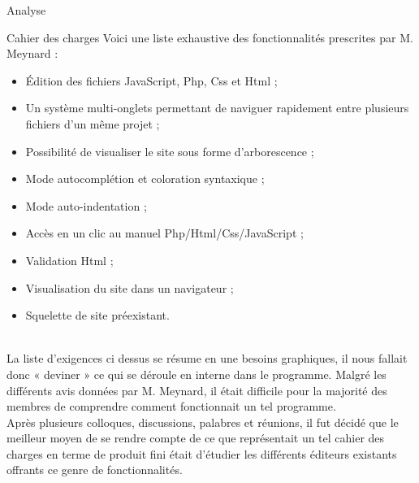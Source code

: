 \documentclass[a4paper, 12pt]{report}
\begin{document}
	\begin{part}{Analyse}
		\begin{chapter}{Cahier des charges}
			Voici une liste exhaustive des fonctionnalités prescrites par M. Meynard :
			\begin{itemize}
				\item Édition des fichiers \gls{JavaScript}, \gls{Php}, \gls{Css} et \gls{Html} ;
				\item Un système multi-onglets permettant de naviguer rapidement entre plusieurs fichiers d'un même projet ;
				\item Possibilité de visualiser le site sous forme d'arborescence ;
				\item Mode \gls{autocomplétion} et coloration syntaxique ;
				\item Mode auto-indentation ;
				\item Accès en un clic au manuel \gls{Php}/\gls{Html}/\gls{Css}/\gls{JavaScript} ;
				\item Validation \gls{Html} ;
				\item Visualisation du site dans un navigateur ;
				\item Squelette de site préexistant.
			\end{itemize}~\\

			La liste d'exigences ci dessus se résume en une besoins graphiques, il nous fallait donc « deviner » ce qui se déroule en interne 
			dans le programme. Malgré les différents avis données par M. Meynard, il était difficile pour la majorité des membres de
			comprendre comment fonctionnait un tel programme.\\

			Après plusieurs colloques, discussions, palabres et réunions, il fut décidé que le meilleur moyen de se rendre compte de ce que
			représentait un tel cahier des charges en terme de produit fini était d'étudier les différents éditeurs existants offrants ce 
			genre de fonctionnalités.
		\end{chapter}


\end{part}
\end{document}
